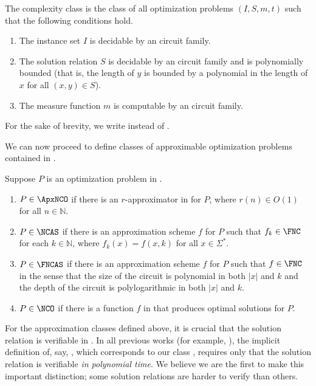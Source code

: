 \documentclass[]{article}
\begin{document}
\begin{definition}\label{def:nnco}
  The complexity class \NNCOpoly{} is the class of all optimization problems $(I, S, m, t)$ such that the following conditions hold.
  \begin{enumerate}
  \item The instance set $I$ is decidable by an \NC{} circuit family.
  \item The solution relation $S$ is decidable by an \NC{} circuit family and is polynomially bounded (that is, the length of $y$ is bounded by a polynomial in the length of $x$ for all $(x, y)\in S$).
  \item The measure function $m$ is computable by an \FNC{} circuit family.
  \end{enumerate}
  For the sake of brevity, we write \NNCO{} instead of \NNCOpoly{}.
\end{definition}

We can now proceed to define classes of approximable optimization problems contained in \NNCO.

\begin{definition}\label{def:ncx}
  Suppose $P$ is an optimization problem in \NNCO.
  \begin{enumerate}
  \item $P \in \ApxNCO$ if there is an $r$-approximator in \FNC{} for $P$, where $r(n) \in O(1)$ for all $n \in \mathbb{N}$.
  \item $P \in \NCAS$ if there is an approximation scheme $f$ for $P$ such that $f_k \in \FNC$ for each $k \in \mathbb{N}$, where $f_k(x) = f(x, k)$ for all $x \in \Sigma^*$.
  \item $P \in \FNCAS$ if there is an approximation scheme $f$ for $P$ such that $f \in \FNC$ in the sense that the size of the circuit is polynomial in both $|x|$ and $k$ and the depth of the circuit is polylogarithmic in both $|x|$ and $k$.
  \item $P \in \NCO$ if there is a function $f$ in \FNC{} that produces optimal solutions for $P$.
  \end{enumerate}
\end{definition}

For the \NC{} approximation classes defined above, it is crucial that the solution relation is verifiable in \NC{}.
In all previous works (for example, \cite{dsst97, sx95}), the implicit definition of, say, \NCX{}, which corresponds to our class \ApxNCO, requires only that the solution relation is verifiable \emph{in polynomial time}.
We believe we are the first to make this important distinction; some solution relations are harder to verify than others.
\end{document}
